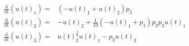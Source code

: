 \begin{align}
\mathrm{\frac{d}{d t}}\left( u(t)_1 \right) =& \left(  - u(t)_1 + u(t)_2 \right) p_3 \\
\mathrm{\frac{d}{d t}}\left( u(t)_2 \right) =&  - u(t)_2 + \frac{1}{10} \left(  - u(t)_1 + p_1 \right) p_2 p_3 u(t)_1 \\
\mathrm{\frac{d}{d t}}\left( u(t)_3 \right) =& u(t)_2^{\frac{2}{3}} u(t)_1 - p_3 u(t)_3
\end{align}
